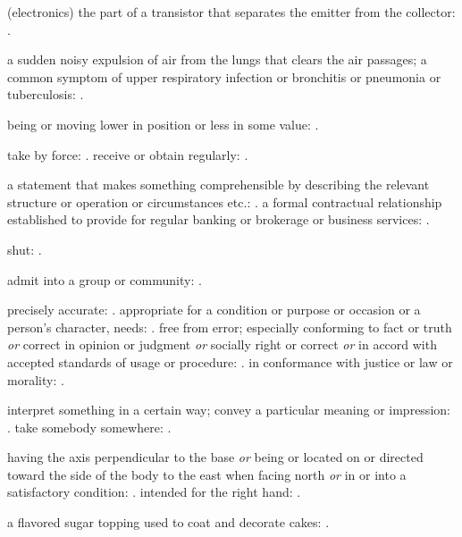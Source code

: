   (electronics) the part of a transistor that separates the emitter from the collector: .

  a sudden noisy expulsion of air from the lungs that clears the air passages; a common symptom of upper respiratory infection or bronchitis or pneumonia or tuberculosis:   .

  being or moving lower in position or less in some value: .

  take by force: . receive or obtain regularly:   .

  a statement that makes something comprehensible by describing the relevant structure or operation or circumstances etc.:   . a formal contractual relationship established to provide for regular banking or brokerage or business services:   .

  shut: .

  admit into a group or community:   .

  precisely accurate:   . appropriate for a condition or purpose or occasion or a person's character, needs:   . free from error; especially conforming to fact or truth \textit{or} correct in opinion or judgment \textit{or} socially right or correct \textit{or} in accord with accepted standards of usage or procedure:   . in conformance with justice or law or morality: .

  interpret something in a certain way; convey a particular meaning or impression:   . take somebody somewhere:   .

  having the axis perpendicular to the base \textit{or} being or located on or directed toward the side of the body to the east when facing north \textit{or} in or into a satisfactory condition: . intended for the right hand:   .

  a flavored sugar topping used to coat and decorate cakes:   .

